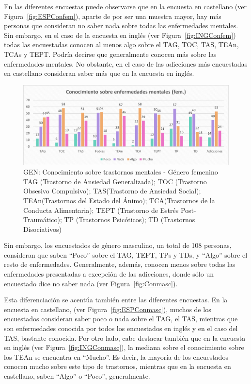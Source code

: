 \documentclass[12pt, a4paper,twoside,titlepage]{book}
\begin{document}
En las diferentes encuestas puede observarse que en la encuesta en castellano (ver Figura~\ref{fig:ESPConfem}), aparte de por ser una muestra mayor, hay más personas que consideran no saber nada sobre todas las enfermedades mentales. Sin embargo, en el caso de la encuesta en inglés (ver Figura~\ref{fig:INGConfem}) todas las encuestadas conocen al menos algo sobre el TAG, TOC, TAS, TEAn, TCAs y TEPT. Podría decirse que generalmente conocen más sobre las enfermedades mentales. No obstante, en el caso de las adicciones más encuestadas en castellano consideran saber más que en la encuesta en inglés. 


\begin{figure}
\centering
 \includegraphics[width=1\linewidth]{ANEXO Gen/11AnexGENCongfem}
 \caption{GEN: Conocimiento sobre trastornos mentales - Género femenino\\
 TAG (Trastorno de Ansiedad Generalizada); TOC (Trastorno Obsesivo Compulsivo); TAS(Trastorno de Ansiedad Social); TEAn(Trastornos del Estado del Ánimo); TCA(Trastornos de la Conducta Alimentaria); TEPT (Trastorno de Estrés Post-Traumático); TP (Trastornos Psicóticos); TD (Trastornos Disociativos) }
 \label{fig:Confem}
 \end{figure}



Sin embargo, los encuestados de género masculino, un total de 108 personas, consideran que saben “Poco” sobre el TAG, TEPT, TPs y TDs, y “Algo” sobre el resto de enfermedades. Generalmente, además, conocen menos sobre todas las enfermedades presentadas a excepción de las adicciones, donde sólo un encuestado dice no saber nada (ver Figura~\ref{fig:Conmasc}). 

Esta diferenciación se acentúa también entre las diferentes encuestas. En la encuesta en castellano, (ver Figura~\ref{fig:ESPConmasc}),  muchos de los encuestados consideran saber poco o nada sobre el TAG, el TAS, mientras que son enfermedades conocida por todos los encuestados en inglés y en el caso del TAS, bastante conocida. Por otro lado, cabe destacar también que en la encuesta en inglés (ver Figura~\ref{fig:INGConmasc}), la mediana sobre el conocimiento sobre los TEAn se encuentra en “Mucho”. Es decir, la mayoría de los encuestados conocen mucho sobre este tipo de trastornos, mientras que en la encuesta en castellano, saben “Algo” o “Poco”, generalmente. 
\end{document}

